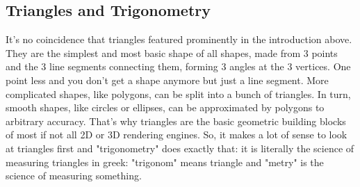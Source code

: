 
\begin{comment}

https://www.mathplanet.com/education/geometry/perpendicular-and-parallel/angles-parallel-lines-and-transversals

https://thirdspacelearning.com/gcse-maths/geometry-and-measure/angles-in-parallel-lines/

https://thirdspacelearning.com/gcse-maths/geometry-and-measure/angle-rules/

https://thirdspacelearning.com/gcse-maths/geometry-and-measure/alternate-angles/
https://thirdspacelearning.com/gcse-maths/geometry-and-measure/corresponding-angles/

https://thirdspacelearning.com/gcse-maths/geometry-and-measure/supplementary-angles/ aka adjacent?

https://thirdspacelearning.com/gcse-maths/geometry-and-measure/co-interior-angles/ aka neighbor?

https://thirdspacelearning.com/gcse-maths/geometry-and-measure/vertically-opposite-angles/ aka opposite


https://thirdspacelearning.com/gcse-maths/geometry-and-measure/types-of-angles/


https://www.cuemath.com/geometry/alternate-interior-angles/
https://www.cuemath.com/geometry/alternate-exterior-angles/

https://www.mathsisfun.com/geometry/parallel-lines.html
https://www.mathsisfun.com/geometry/consecutive-interior-angles.html
https://www.mathsisfun.com/geometry/alternate-interior-angles.html
https://www.mathsisfun.com/geometry/alternate-exterior-angles.html


\end{comment}


\subsection{Triangles and Trigonometry}
It's no coincidence that triangles featured prominently in the introduction above. They are the simplest and most basic shape of all shapes, made from 3 points and the 3 line segments connecting them, forming 3 angles at the 3 vertices. One point less and you don't get a shape anymore but just a line segment. More complicated shapes, like polygons, can be split into a bunch of triangles. In turn, smooth shapes, like circles or ellipses, can be approximated by polygons to arbitrary accuracy. That's why triangles are the basic geometric building blocks of most if not all 2D or 3D rendering engines. So, it makes a lot of sense to look at triangles first and "trigonometry" does exactly that: it is literally the science of measuring triangles in greek: "trigonom" means triangle and "metry" is the science of measuring something.

